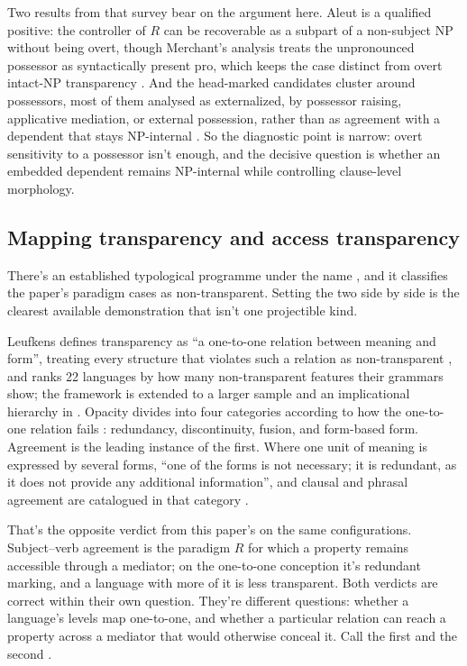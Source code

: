 Two results from that survey bear on the argument here. Aleut is a qualified positive: the controller of $R$ can be recoverable as a subpart of a non-subject NP without being overt, though Merchant's analysis treats the unpronounced possessor as syntactically present pro, which keeps the case distinct from overt intact-NP transparency \autocite[195]{merchant-2011-aleut-case-matters}. And the head-marked candidates cluster around possessors, most of them analysed as externalized, by possessor raising, applicative mediation, or external possession, rather than as agreement with a dependent that stays NP-internal \autocite{ritchie-2016-prominent-internal-possessors,deal-2017-external-possession}. So the diagnostic point is narrow: overt sensitivity to a possessor isn't enough, and the decisive question is whether an embedded dependent remains NP-internal while controlling clause-level morphology.


\subsection{Mapping transparency and access transparency}\label{sec:6-mapping}

There's an established typological programme under the name , and it classifies the paper's paradigm cases as non-transparent. Setting the two side by side is the clearest available demonstration that  isn't one projectible kind.

Leufkens defines transparency as \enquote{a one-to-one relation between meaning and form}, treating every structure that violates such a relation as non-transparent \autocite[2]{leufkens2015}, and ranks 22 languages by how many non-transparent features their grammars show; the framework is extended to a larger sample and an implicational hierarchy in \textcite{hengeveld-leufkens-2018}. Opacity divides into four categories according to how the one-to-one relation fails \autocite[16, §§4.1--4.4]{leufkens2015}: redundancy, discontinuity, fusion, and form-based form. Agreement is the leading instance of the first. Where one unit of meaning is expressed by several forms, \enquote{one of the forms is not necessary; it is redundant, as it does not provide any additional information}, and clausal and phrasal agreement are catalogued in that category \autocite[18, §§4.1.3--4.1.4]{leufkens2015}.

That's the opposite verdict from this paper's on the same configurations. Subject--verb agreement is the paradigm $R$ for which a property remains accessible through a mediator; on the one-to-one conception it's redundant marking, and a language with more of it is less transparent. Both verdicts are correct within their own question. They're different questions: whether a language's levels map one-to-one, and whether a particular relation can reach a property across a mediator that would otherwise conceal it. Call the first  and the second .

